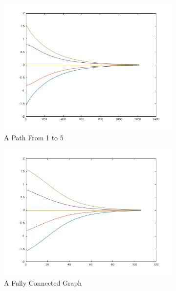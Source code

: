 \documentclass{article}
\begin{document}
\begin{figure}[h!]
\caption{Initial Values Between ($-\pi/2$ to $\pi/2$)}
\centering
\begin{subfigure}[t]{0.3\textwidth}
\centering
\includegraphics[width=\textwidth]{./pi-ov2-min.png}
\caption{A Path From 1 to 5}
\end{subfigure}
\begin{subfigure}[t]{0.3\textwidth}
\centering
\includegraphics[width=\textwidth]{pi-ov2-max.png}
\caption{A Fully Connected Graph}
\end{subfigure}
\begin{subfigure}[t]{0.3\textwidth}
\centering

\end{subfigure}
\end{figure}
\end{document}
